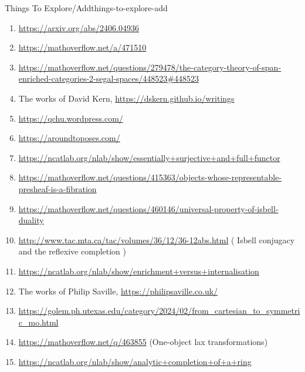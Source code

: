 \begin{remark}{Things To Explore/Add}{things-to-explore-add}
\begin{enumerate}
\begin{enumerate}
                \item \url{http://maths.mq.edu.au/~street/EffR.pdf}
                \item \url{https://arxiv.org/abs/math/0301015}
                \item \href{https://twitter.com/ColmezPierre/status/1809308351643165181?t=KAESWH44ufE7486diGcxrA}{Pierre Colmez's comment }
                \item I wonder if one could apply an analogue of this construction to the sphere spectrum and obtain a kind of spectral version of the real numbers, as in e.g.\ following the spirit of \href{MO 443018}{https://mathoverflow.net/questions/443018}.
            \end{enumerate}
        \item \url{https://arxiv.org/abs/2406.04936}
        \item \url{https://mathoverflow.net/a/471510}
        \item \url{https://mathoverflow.net/questions/279478/the-category-theory-of-span-enriched-categories-2-segal-spaces/448523#448523}
        \item The works of David Kern, \url{https://dskern.github.io/writings}
        \item \url{https://qchu.wordpress.com/}
        \item \url{https://aroundtoposes.com/}
        \item \url{https://ncatlab.org/nlab/show/essentially+surjective+and+full+functor}
        \item \url{https://mathoverflow.net/questions/415363/objects-whose-representable-presheaf-is-a-fibration}
        \item \url{https://mathoverflow.net/questions/460146/universal-property-of-isbell-duality}
        \item \url{http://www.tac.mta.ca/tac/volumes/36/12/36-12abs.html} ( Isbell conjugacy and the reflexive completion )
        \item \url{https://ncatlab.org/nlab/show/enrichment+versus+internalisation}
        \item The works of Philip Saville, \url{https://philipsaville.co.uk/}
        \item \url{https://golem.ph.utexas.edu/category/2024/02/from\_cartesian\_to\_symmetric\_mo.html}
        \item \url{https://mathoverflow.net/q/463855} (One-object lax transformations)
        \item \url{https://ncatlab.org/nlab/show/analytic+completion+of+a+ring}

\end{enumerate}
\end{remark}
